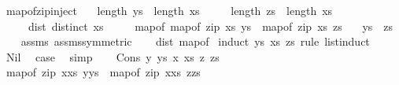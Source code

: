 \begin{isabellebody}
%
\endisadelimproof
\isanewline
{}\isamarkupfalse%
\ map{\isacharunderscore}{\kern0pt}of{\isacharunderscore}{\kern0pt}zip{\isacharunderscore}{\kern0pt}inject{\isacharcolon}{\kern0pt}\isanewline
\ \ \ {\isachardoublequoteopen}length\ ys\ {\isacharequal}{\kern0pt}\ length\ xs{\isachardoublequoteclose}\isanewline
\ \ \ \ \ {\isachardoublequoteopen}length\ zs\ {\isacharequal}{\kern0pt}\ length\ xs{\isachardoublequoteclose}\isanewline
\ \ \ \ \ dist{\isacharcolon}{\kern0pt}\ {\isachardoublequoteopen}distinct\ xs{\isachardoublequoteclose}\isanewline
\ \ \ \ \ map{\isacharunderscore}{\kern0pt}of{\isacharcolon}{\kern0pt}\ {\isachardoublequoteopen}map{\isacharunderscore}{\kern0pt}of\ {\isacharparenleft}{\kern0pt}zip\ xs\ ys{\isacharparenright}{\kern0pt}\ {\isacharequal}{\kern0pt}\ map{\isacharunderscore}{\kern0pt}of\ {\isacharparenleft}{\kern0pt}zip\ xs\ zs{\isacharparenright}{\kern0pt}{\isachardoublequoteclose}\isanewline
\ \ \ {\isachardoublequoteopen}ys\ {\isacharequal}{\kern0pt}\ zs{\isachardoublequoteclose}\isanewline
%
\isadelimproof
\ \ %
\endisadelimproof
%
\isatagproof
{}\isamarkupfalse%
\ assms{\isacharparenleft}{\kern0pt}{}{\isacharparenright}{\kern0pt}\ assms{\isacharparenleft}{\kern0pt}{}{\isacharparenright}{\kern0pt}{\isacharbrackleft}{\kern0pt}symmetric{\isacharbrackright}{\kern0pt}\isanewline
\ \ \isamarkupfalse%
\ dist\ map{\isacharunderscore}{\kern0pt}of\isanewline
{}\isamarkupfalse%
\ {\isacharparenleft}{\kern0pt}induct\ ys\ xs\ zs\ rule{\isacharcolon}{\kern0pt}\ list{\isacharunderscore}{\kern0pt}induct{}{\isacharparenright}{\kern0pt}\isanewline
\ \ \isamarkupfalse%
\ Nil\ \isamarkupfalse%
\ {\isacharquery}{\kern0pt}case\ \isamarkupfalse%
\ simp\isanewline
{}\isamarkupfalse%
\isanewline
\ \ \isamarkupfalse%
\ {\isacharparenleft}{\kern0pt}Cons\ y\ ys\ x\ xs\ z\ zs{\isacharparenright}{\kern0pt}\isanewline
\ \ \isamarkupfalse%
\ {\isacartoucheopen}map{\isacharunderscore}{\kern0pt}of\ {\isacharparenleft}{\kern0pt}zip\ {\isacharparenleft}{\kern0pt}x{\isacharhash}{\kern0pt}xs{\isacharparenright}{\kern0pt}\ {\isacharparenleft}{\kern0pt}y{\isacharhash}{\kern0pt}ys{\isacharparenright}{\kern0pt}{\isacharparenright}{\kern0pt}\ {\isacharequal}{\kern0pt}\ map{\isacharunderscore}{\kern0pt}of\ {\isacharparenleft}{\kern0pt}zip\ {\isacharparenleft}{\kern0pt}x{\isacharhash}{\kern0pt}xs{\isacharparenright}{\kern0pt}\ {\isacharparenleft}{\kern0pt}z{\isacharhash}{\kern0pt}zs{\isacharparenright}{\kern0pt}{\isacharparenright}{\kern0pt}{\isacartoucheclose}\isanewline

\end{isabellebody}

